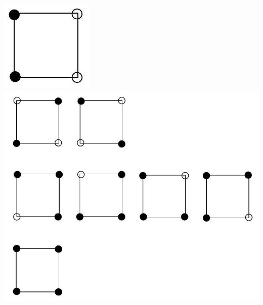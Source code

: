 \documentclass[10pt]{article}
\begin{document}
\includegraphics[max width=\textwidth, center]{2025_09_05_3ba26226ec0baddb5a03g-56(7)}\\
\includegraphics[max width=\textwidth, center]{2025_09_05_3ba26226ec0baddb5a03g-57(2)}
\end{document}
